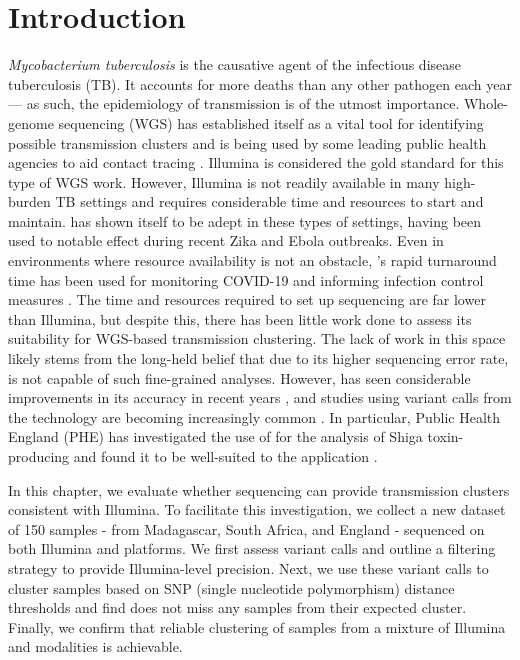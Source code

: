 \section{Introduction}
\textit{Mycobacterium tuberculosis} is the causative agent of the infectious disease tuberculosis (TB). It accounts for more deaths than any other pathogen each year \cite{who2020} — as such, the epidemiology of \mtb{} transmission is of the utmost importance. Whole-genome sequencing (WGS) has established itself as a vital tool for identifying possible transmission clusters and is being used by some leading public health agencies to aid contact tracing \cite{phe-tb-england,brooks2020}. Illumina is considered the gold standard for this type of WGS work. However, Illumina is not readily available in many high-burden TB settings and requires considerable time and resources to start and maintain. \ont{} has shown itself to be adept in these types of settings, having been used to notable effect during recent Zika \cite{faria2016} and Ebola \cite{quick2016,Hoenen2016} outbreaks. Even in environments where resource availability is not an obstacle, \ont{}'s rapid turnaround time has been used for monitoring COVID-19 and informing infection control measures \cite{meredith2020}. The time and resources required to set up \ont{} sequencing are far lower than Illumina, but despite this, there has been little work done to assess its suitability for \mtb{} WGS-based transmission clustering. The lack of work in this space likely stems from the long-held belief that due to its higher sequencing error rate, \ont{} is not capable of such fine-grained analyses. However, \ont{} has seen considerable improvements in its accuracy in recent years \cite{wick2019}, and studies using variant calls from the technology are becoming increasingly common \cite{sanderson2020,watson2020}. In particular, Public Health England (PHE) has investigated the use of \ont{} for the analysis of Shiga toxin-producing \ecoli{} and found it to be well-suited to the application \cite{greig2021}. 

In this chapter, we evaluate whether \ont{} sequencing can provide \mtb{} transmission clusters consistent with Illumina. To facilitate this investigation, we collect a new dataset of 150 samples - from Madagascar, South Africa, and England - sequenced on both Illumina and \ont{} platforms. We first assess \ont{} variant calls and outline a filtering strategy to provide Illumina-level precision. Next, we use these variant calls to cluster samples based on SNP (single nucleotide polymorphism) distance thresholds and find \ont{} does not miss any samples from their expected cluster. Finally, we confirm that reliable clustering of samples from a mixture of Illumina and \ont{} modalities is achievable.

